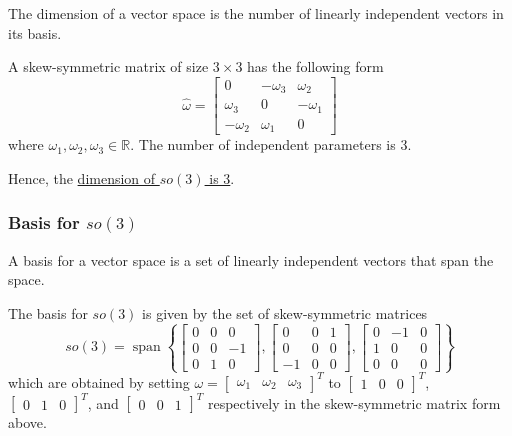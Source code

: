 The dimension of a vector space is the number of linearly independent vectors in its basis.

A skew-symmetric matrix of size \( 3 \times 3 \) has the following form
\begin{equation*}
    \hat \omega = \begin{bmatrix}
        0         & -\omega_3 & \omega_2  \\
        \omega_3  & 0         & -\omega_1 \\
        -\omega_2 & \omega_1  & 0
    \end{bmatrix}
\end{equation*}
where \( \omega_1, \omega_2, \omega_3 \in \mathbb{R} \).
The number of independent parameters is 3.

Hence, the \underline{dimension of \( so(3) \) is 3}.

\subsubsection*{Basis for \( so(3) \)}

A basis for a vector space is a set of linearly independent vectors that span the space.

The basis for \( so(3) \) is given by the set of skew-symmetric matrices
\begin{equation*}
    so(3) = \operatorname{span}
    \left \{ \begin{bmatrix}
        0 & 0 & 0  \\
        0 & 0 & -1 \\
        0 & 1 & 0
    \end{bmatrix},
    \begin{bmatrix}
        0  & 0 & 1 \\
        0  & 0 & 0 \\
        -1 & 0 & 0
    \end{bmatrix},
    \begin{bmatrix}
        0 & -1 & 0 \\
        1 & 0  & 0 \\
        0 & 0  & 0
    \end{bmatrix} \right \}
\end{equation*}
which are obtained by setting \( \omega = \begin{bmatrix} \omega_1 & \omega_2 & \omega_3 \end{bmatrix}^{T} \) to \( \begin{bmatrix} 1 & 0 & 0 \end{bmatrix}^{T} \), \( \begin{bmatrix} 0 & 1 & 0 \end{bmatrix}^{T} \), and \( \begin{bmatrix} 0 & 0 & 1 \end{bmatrix}^{T} \) respectively in the skew-symmetric matrix form above.
